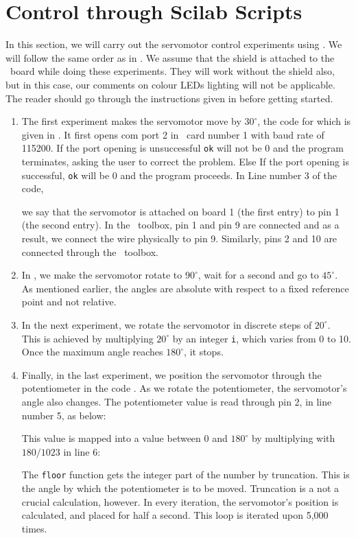 \section{Control through Scilab Scripts}
\label{sec:servo-sci}
In this section, we will carry out the servomotor control experiments
using \scilab.  We will follow the same order as in
.  We assume that the shield is attached to the
\arduino\ board while doing these experiments.  They will work without
the shield also, but in this case, our comments on colour LEDs
lighting will not be applicable.  The reader should go through the
instructions given in  before getting started.
\begin{enumerate}
\item The first experiment makes the servomotor move by $30^\circ$,
  the code for which is given in .
  It first opens com port 2 in \arduino\ card number 1 with baud rate
  of 115200.  If the port opening is unsuccessful {\tt ok} will not be
  0 and the program terminates, asking the user to correct the
  problem.  Else If the port opening is successful, {\tt ok} will be 0
  and the program proceeds.  In Line number 3 of the code, \ie\
  
  we say that the servomotor is attached on board 1 (the first entry)
  to pin 1 (the second entry).  In the \scilab\ toolbox, pin 1 and pin
  9 are connected and as a result, we connect the wire physically to
  pin 9.  Similarly, pins 2 and 10 are connected through the
  \scilab\ toolbox.

\item In , we make the servomotor rotate
  to $90^\circ$, wait for a second and go to $45^\circ$.  As mentioned
  earlier, the angles are absolute with respect to a fixed reference
  point and not relative.  

\item In the next experiment, we rotate the servomotor in discrete
  steps of $20^\circ$.  This is achieved by multiplying $20^\circ$ by
  an integer {\tt i}, which varies from 0 to 10.  Once the maximum
  angle reaches $180^\circ$, it stops.  

\item Finally, in the last experiment, we position the servomotor
  through the potentiometer in the code .  As we
  rotate the potentiometer, the servomotor's angle also changes.  The
  potentiometer value is read through pin 2, in line number 5, as
  below:
  
  This value is mapped into a value between 0 and $180^\circ$ by
  multiplying with $180/1023$ in line 6:
  
  The {\tt floor} function gets the integer part of the number by
  truncation.  This is the angle by which the potentiometer is to be
  moved.  Truncation is a not a crucial calculation, however.  In
  every iteration, the servomotor's position is calculated, and placed
  for half a second.  This loop is iterated upon 5,000 times.
\end{enumerate}

